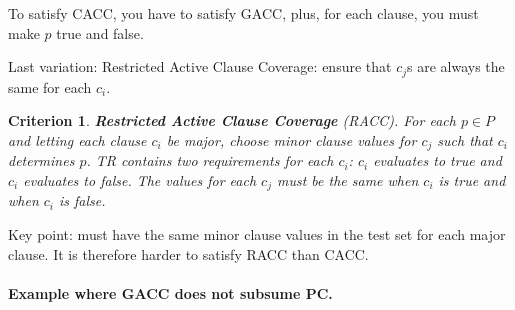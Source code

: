 \documentclass[11pt]{article}
\newtheorem{crit}{Criterion}
\begin{document}
To satisfy CACC, you have to satisfy GACC, plus, for each clause,
you must make $p$ true and false.

Last variation: Restricted Active Clause Coverage: ensure that
$c_j$s are always the same for each $c_i$. 

\begin{crit}
{\bf Restricted Active Clause Coverage} (RACC). For each $p \in P$ and
letting each clause $c_i$ be major, choose minor clause values
for $c_j$ such that $c_i$ determines $p$. TR contains two requirements
for each $c_i$: $c_i$ evaluates to true and $c_i$ evaluates to false.
The values for each $c_j$ must be the same when $c_i$ is true and
when $c_i$ is false.
\end{crit}

Key point: must have the same minor clause values in the test set for
each major clause. It is therefore harder to satisfy RACC than CACC.


\paragraph{Example where GACC does not subsume PC.} ~ \\[3em]

\end{document}
